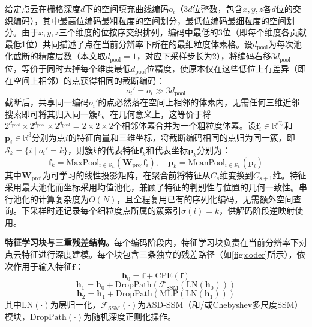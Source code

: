 \documentclass[12pt,a4paper,openany,oneside]{ctexbook}
\theoremstyle{definition}
\theoremstyle{remark}
\begin{document}
给定点云在栅格深度$d$下的空间填充曲线编码$o_i$（$3d$位整数，包含$x, y, z$各$d$位的交织编码），其中最高位编码最粗粒度的空间划分，最低位编码最细粒度的空间划分。由于$x, y, z$三个维度的位按序交织排列，编码中最低的3位（即每个维度各贡献最低1位）共同描述了点在当前分辨率下所在的最细粒度体素格。设$d_{\text{pool}}$为每次池化截断的精度层数（本文取$d_{\text{pool}}=1$，对应下采样步长为2），将编码右移$3d_{\text{pool}}$位，等价于同时去掉每个维度最低$d_{\text{pool}}$位精度，使原本仅在这些低位上有差异（即在空间上相邻）的点获得相同的截断编码：
\begin{equation}
    o_i' = o_i \gg 3 d_{\text{pool}}
\end{equation}
截断后，共享同一编码$o_i'$的点必然落在空间上相邻的体素内，无需任何三维近邻搜索即可将其归入同一簇$k$。在几何意义上，这等价于将$2^{d_{\text{pool}}} \times 2^{d_{\text{pool}}} \times 2^{d_{\text{pool}}} = 2\times2\times2$个相邻体素合并为一个粗粒度体素。设$\mathbf{f}_i \in \mathbb{R}^{C_s}$和$\mathbf{p}_i \in \mathbb{R}^3$分别为点$i$的特征向量和三维坐标，将截断编码相同的点归为同一簇，即$\mathcal{S}_k = \{i \mid o_i' = k\}$，则簇$k$的代表特征$\mathbf{f}_k$和代表坐标$\mathbf{p}_k$分别为：
\begin{equation}
    \mathbf{f}_k = \text{MaxPool}_{i \in \mathcal{S}_k}\!\left(\mathbf{W}_{\text{proj}}\mathbf{f}_i\right), \quad
    \mathbf{p}_k = \text{MeanPool}_{i \in \mathcal{S}_k}(\mathbf{p}_i)
\end{equation}
其中$\mathbf{W}_{\text{proj}}$为可学习的线性投影矩阵，在聚合前将特征从$C_s$维变换到$C_{s+1}$维。特征采用最大池化而坐标采用均值池化，兼顾了特征的判别性与位置的几何一致性。串行池化的计算复杂度为$O(N)$，且全程复用已有的序列化编码，无需额外空间查询。下采样时还记录每个细粒度点所属的簇索引$\sigma(i)=k$，供解码阶段逆映射使用。

\textbf{特征学习块与三重残差结构。}每个编码阶段内，特征学习块负责在当前分辨率下对点云特征进行深度建模。每个块包含三条独立的残差路径（如\cref{fig:coder}所示），依次作用于输入特征$\mathbf{f}$：
\begin{equation}
    \mathbf{h}_0 = \mathbf{f} + \text{CPE}(\mathbf{f})
    \label{eq:res_cpe}
\end{equation}
\begin{equation}
    \mathbf{h}_1 = \mathbf{h}_0 + \text{DropPath}\!\left(\mathcal{F}_{\text{SSM}}\!\left(\text{LN}(\mathbf{h}_0)\right)\right)
    \label{eq:res_ssm}
\end{equation}
\begin{equation}
    \mathbf{h}_2 = \mathbf{h}_1 + \text{DropPath}\!\left(\text{MLP}\!\left(\text{LN}(\mathbf{h}_1)\right)\right)
    \label{eq:res_mlp}
\end{equation}
其中$\text{LN}(\cdot)$为层归一化，$\mathcal{F}_{\text{SSM}}(\cdot)$为ASD-SSM（和/或Chebyshev多尺度SSM）模块，$\text{DropPath}(\cdot)$为随机深度正则化操作。
\end{document}
